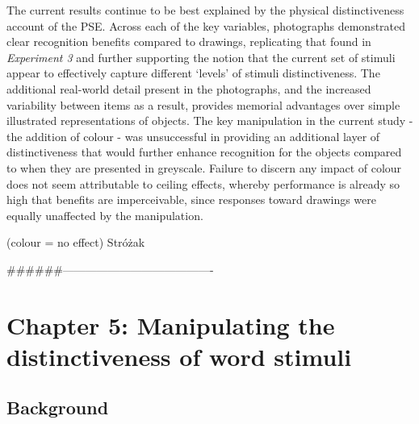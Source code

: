 \documentclass[
  11pt,
]{article}
\begin{document}
The current results continue to be best explained by the physical
distinctiveness account of the PSE. Across each of the key variables,
photographs demonstrated clear recognition benefits compared to
drawings, replicating that found in \emph{Experiment 3} and further
supporting the notion that the current set of stimuli appear to
effectively capture different `levels' of stimuli distinctiveness. The
additional real-world detail present in the photographs, and the
increased variability between items as a result, provides memorial
advantages over simple illustrated representations of objects. The key
manipulation in the current study - the addition of colour - was
unsuccessful in providing an additional layer of distinctiveness that
would further enhance recognition for the objects compared to when they
are presented in greyscale. Failure to discern any impact of colour does
not seem attributable to ceiling effects, whereby performance is already
so high that benefits are imperceivable, since responses toward drawings
were equally unaffected by the manipulation.

(colour = no effect) Stróżak

\#\#\#\#\#\#----------------------------------------

\newpage

\hypertarget{chapter-5-manipulating-the-distinctiveness-of-word-stimuli}{%
\section{Chapter 5: Manipulating the distinctiveness of word
stimuli}\label{chapter-5-manipulating-the-distinctiveness-of-word-stimuli}}

\hypertarget{background-3}{%
\subsection{Background}\label{background-3}}
\end{document}
